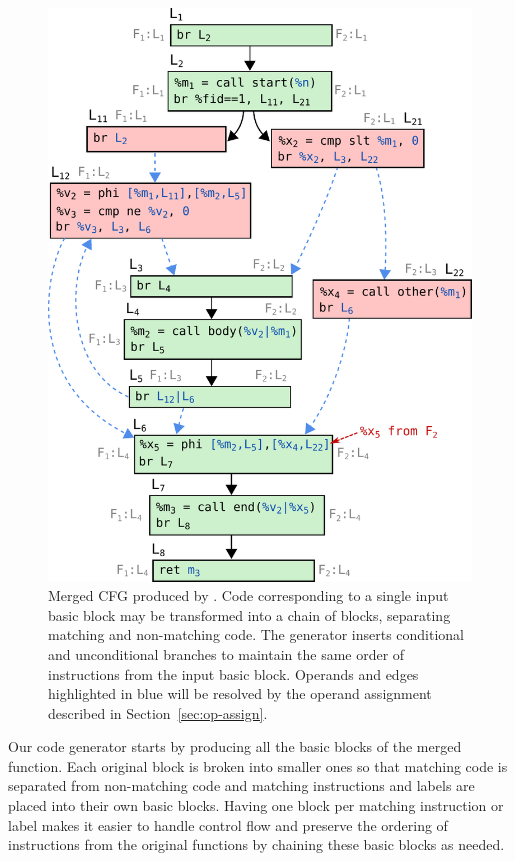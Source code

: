 \begin{figure}[t!]
  \centering
  \includegraphics[scale=0.75]{src/merge-operation/figs/code-gen-cfg.pdf}
    \caption{Merged CFG produced by {\ProjName}. Code corresponding to a single
      input basic block may be transformed into a chain of blocks, separating
      matching and non-matching code. The generator inserts conditional and
      unconditional branches to maintain the same order of instructions
      from the input basic block. Operands and edges highlighted in blue will be
      resolved by the operand assignment described in Section~\ref{sec:op-assign}.}
  \label{fig:code-gen-cfg}
\end{figure}


Our code generator starts by producing all the basic blocks of the merged function.
Each original block is broken into smaller ones so that matching code is
separated from non-matching code and matching instructions and labels are placed
into their own basic blocks. Having one block per matching instruction or label
makes it easier to handle control flow and preserve the ordering of instructions
from the original functions by chaining these basic blocks as needed.

